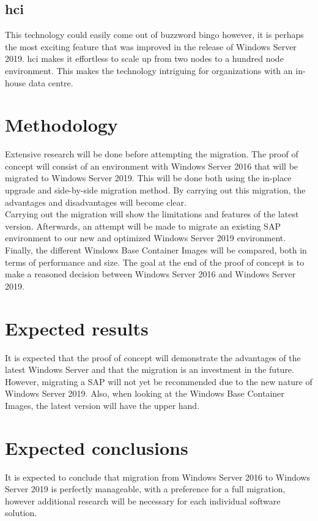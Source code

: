 \subsection{\acrfull{hci}}
This technology could easily come out of buzzword bingo however, it is perhaps the most exciting feature that was improved in the release of Windows Server 2019. 
\acrshort{hci} makes it effortless to scale up from two nodes to a hundred node environment. 
This makes the technology intriguing for organizations with an in-house data centre.
\section{Methodology}\label{sec:methodology}
Extensive research will be done before attempting the migration. The proof of concept will consist of an environment with Windows Server 2016 that will be migrated to Windows Server 2019. This will be done both using the in-place upgrade and side-by-side migration method. By carrying out this migration, the advantages and disadvantages will become clear. \\
Carrying out the migration will show the limitations and features of the latest version. 
Afterwards, an attempt will be made to migrate an existing SAP environment to our new and optimized Windows Server 2019 environment.\\
Finally, the different Windows Base Container Images will be compared, both in terms of performance and size. 
The goal at the end of the proof of concept is to make a reasoned decision between Windows Server 2016 and Windows Server 2019.
\section{Expected results}\label{sec:anticipated_results}
It is expected that the proof of concept will demonstrate the advantages of the latest Windows Server and that the migration is an investment in the future. However, migrating a SAP will not yet be recommended due to the new nature of Windows Server 2019. Also, when looking at the Windows Base Container Images, the latest version will have the upper hand. 
\section{Expected conclusions}\label{sec:anticipated_conclusions}
It is expected to conclude that migration from Windows Server 2016 to Windows Server 2019 is perfectly manageable, with a preference for a full migration,  however additional research will be necessary for each individual software solution. 